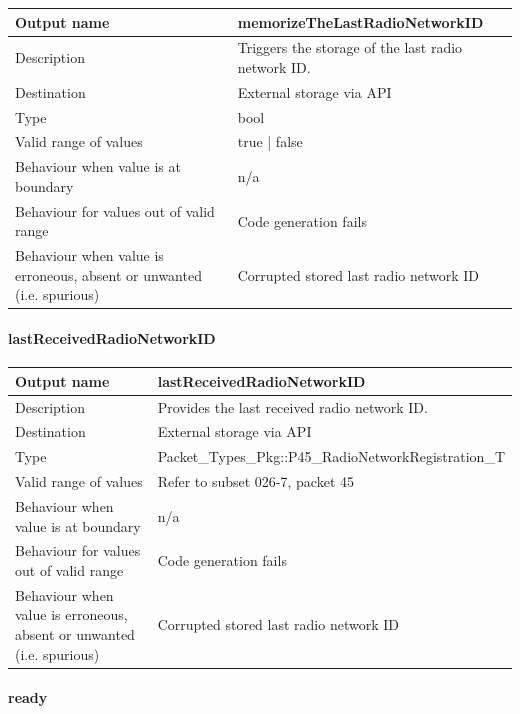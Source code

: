 \begin{longtable}{p{}p{}}
	\toprule
	Output name				& memorizeTheLastRadioNetworkID \\
	\midrule
	Description				& Triggers the storage of the last radio network ID. \\
	\midrule
	Destination				& External storage via API \\ 
	\midrule
	Type					& bool \\
	\midrule
	Valid range of values	& true | false \\
	\midrule
	Behaviour when value is at boundary	& n/a \\
	\midrule
	Behaviour for values out of valid range	& Code generation fails \\
	\midrule
	Behaviour when value is erroneous, absent or unwanted (i.e. spurious) & Corrupted stored last radio network ID \\
	\bottomrule
\end{longtable}


\paragraph{lastReceivedRadioNetworkID}

\begin{longtable}{p{}p{}}
	\toprule
	Output name				& lastReceivedRadioNetworkID \\
	\midrule
	Description				& Provides the last received radio network ID. \\
	\midrule
	Destination				& External storage via API \\ 
	\midrule
	Type					& Packet\_Types\_Pkg::P45\_RadioNetworkRegistration\_T \\
	\midrule
	Valid range of values	& Refer to subset 026-7, packet 45 \\
	\midrule
	Behaviour when value is at boundary	& n/a \\
	\midrule
	Behaviour for values out of valid range	& Code generation fails \\
	\midrule
	Behaviour when value is erroneous, absent or unwanted (i.e. spurious) & Corrupted stored last radio network ID \\
	\bottomrule
\end{longtable}

\paragraph{ready}

